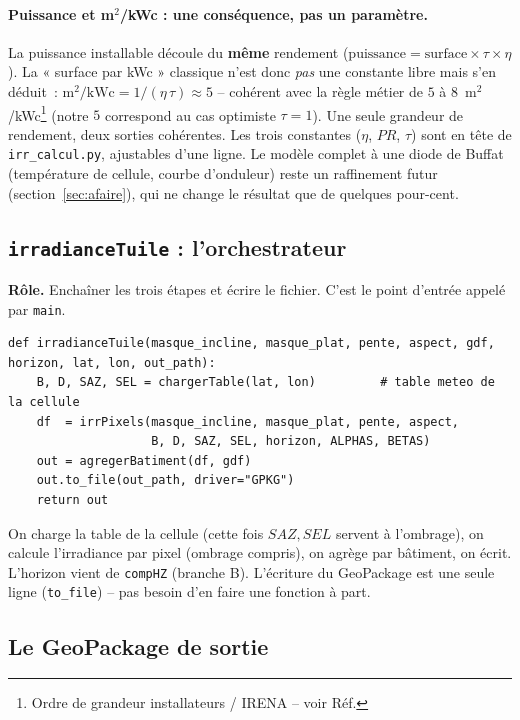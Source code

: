 \documentclass[11pt,a4paper]{article}
\newcommand{\fichier}[1]{\texttt{#1}}
\newcommand{\fonction}[1]{\texttt{#1}}
\begin{document}
\paragraph{Puissance et m$^2$/kWc : une conséquence, pas un paramètre.} La
puissance installable découle du \textbf{même} rendement
($\text{puissance} = \text{surface}\times\tau\times\eta$). La « surface par kWc »
classique n'est donc \emph{pas} une constante libre mais s'en déduit~:
$\text{m}^2/\text{kWc} = 1/(\eta\,\tau) \approx 5$ -- cohérent avec la règle
métier de $5$ à $8$~m$^2$/kWc\footnote{Ordre de grandeur installateurs / IRENA --
voir Réf.} (notre $5$ correspond au cas optimiste $\tau=1$). Une seule grandeur de
rendement, deux sorties cohérentes. Les trois constantes ($\eta$, $PR$, $\tau$)
sont en tête de \fichier{irr\_calcul.py}, ajustables d'une ligne. Le modèle
complet à une diode de Buffat (température de cellule, courbe d'onduleur) reste un
raffinement futur (section~\ref{sec:afaire}), qui ne change le résultat que de
quelques pour-cent.

\subsection{\fonction{irradianceTuile} : l'orchestrateur}

\textbf{Rôle.} Enchaîner les trois étapes et écrire le fichier. C'est le point
d'entrée appelé par \fichier{main}.

\begin{lstlisting}
def irradianceTuile(masque_incline, masque_plat, pente, aspect, gdf, horizon, lat, lon, out_path):
    B, D, SAZ, SEL = chargerTable(lat, lon)         # table meteo de la cellule
    df  = irrPixels(masque_incline, masque_plat, pente, aspect,
                    B, D, SAZ, SEL, horizon, ALPHAS, BETAS)
    out = agregerBatiment(df, gdf)
    out.to_file(out_path, driver="GPKG")
    return out
\end{lstlisting}

On charge la table de la cellule (cette fois $SAZ, SEL$ servent à l'ombrage), on
calcule l'irradiance par pixel (ombrage compris), on agrège par bâtiment, on
écrit. L'horizon vient de \fonction{compHZ} (branche B). L'écriture du
GeoPackage est une seule ligne (\fonction{to\_file}) -- pas besoin d'en faire une
fonction à part.

\subsection{Le GeoPackage de sortie}
\end{document}
